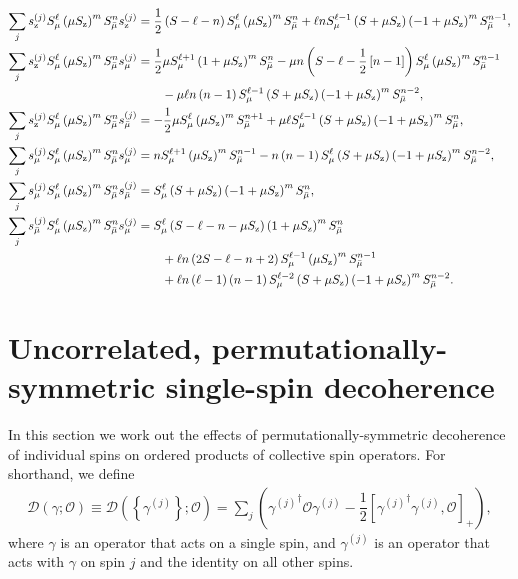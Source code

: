 \documentclass[aps,11pt,notitlepage,nofootinbib,longbibliography]{revtex4-1}
\newcommand{\f}[2]{\dfrac{#1}{#2}} %
\newcommand{\p}[1]{\left(#1\right)} %
\renewcommand{\sp}[1]{\left[#1\right]} %
\renewcommand{\set}[1]{\left\{#1\right\}} %
\newcommand{\D}{\mathcal{D}}
\renewcommand{\O}{\mathcal{O}}
\newcommand{\z}{\text{z}}
\newcommand{\bmu}{{\bar\mu}}
\newcommand{\1}{\mathds{1}}
\begin{document}
\begin{align}
  \sum_j s_\z^{(j)} S_\mu^\ell \p{\mu S_\z}^m S_\bmu^n s_\z^{(j)}
  &= \f12 \p{S-\ell-n} S_\mu^\ell \p{\mu S_\z}^m S_\bmu^n
  + \ell n S_\mu^{\ell-1} \p{S+\mu S_\z}
  \p{-1+\mu S_\z}^m S_\bmu^{n-1},
  \label{eq:san_z_z} \allowdisplaybreaks \\
  \sum_j s_\z^{(j)} S_\mu^\ell \p{\mu S_\z}^m S_\bmu^n s_\mu^{(j)}
  &= \f12 \mu S_\mu^{\ell+1} \p{1+\mu S_\z}^m S_\bmu^n
  - \mu n \p{S-\ell-\f12\sp{n-1}} S_\mu^\ell
  \p{\mu S_\z}^m S_\bmu^{n-1} \notag \\
  &\qquad - \mu\ell n\p{n-1} S_\mu^{\ell-1}
  \p{S+\mu S_\z} \p{-1+\mu S_\z}^m S_\bmu^{n-2},
  \label{eq:san_z_mu} \allowdisplaybreaks \\
  \sum_j s_\z^{(j)} S_\mu^\ell \p{\mu S_\z}^m S_\bmu^n s_\bmu^{(j)}
  &= -\f12 \mu S_\mu^\ell \p{\mu S_\z}^m S_\bmu^{n+1}
  + \mu \ell S_\mu^{\ell-1} \p{S+\mu S_\z} \p{-1+\mu S_\z}^m S_\bmu^n,
  \label{eq:san_z_bmu} \allowdisplaybreaks \\
  \sum_j s_\mu^{(j)} S_\mu^\ell \p{\mu S_\z}^m S_\bmu^n s_\mu^{(j)}
  &= n S_\mu^{\ell+1} \p{\mu S_\z}^m S_\bmu^{n-1}
  - n\p{n-1} S_\mu^\ell \p{S+\mu S_\z} \p{-1+\mu S_\z}^m S_\bmu^{n-2},
  \label{eq:san_mu_mu} \allowdisplaybreaks \\
  \sum_j s_\mu^{(j)} S_\mu^\ell \p{\mu S_\z}^m S_\bmu^n s_\bmu^{(j)}
  &= S_\mu^\ell \p{S+\mu S_\z}\p{-1+\mu S_\z}^m S_\bmu^n,
  \label{eq:san_mu_bmu} \allowdisplaybreaks \\
  \sum_j s_\bmu^{(j)} S_\mu^\ell \p{\mu S_\z}^m S_\bmu^n s_\mu^{(j)}
  &= S_\mu^\ell \p{S - \ell - n - \mu S_\z}
  \p{1+\mu S_\z}^m S_\bmu^n \notag \\
  &\qquad + \ell n \p{2S - \ell - n + 2}
  S_\mu^{\ell-1} \p{\mu S_\z}^m S_\bmu^{n-1} \notag \\
  &\qquad + \ell n \p{\ell-1} \p{n-1} S_\mu^{\ell-2} \p{S+\mu S_\z}
  \p{-1+\mu S_\z}^m S_\bmu^{n-2}.
  \label{eq:san_bmu_mu}
\end{align}


\section{Uncorrelated, permutationally-symmetric single-spin
  decoherence}
\label{sec:decoherence_single}

In this section we work out the effects of permutationally-symmetric
decoherence of individual spins on ordered products of collective spin
operators.  For shorthand, we define
\begin{align}
  \D\p{\gamma;\O} \equiv \D\p{\set{\gamma^{(j)}};\O}
  = \sum_j\p{{\gamma^{(j)}}^\dag \O \gamma^{(j)}
    - \f12\sp{{\gamma^{(j)}}^\dag \gamma^{(j)}, \O}_+},
\end{align}
where $\gamma$ is an operator that acts on a single spin, and
$\gamma^{(j)}$ is an operator that acts with $\gamma$ on spin $j$ and
the identity on all other spins.
\end{document}
